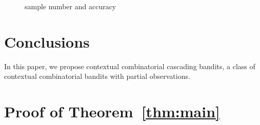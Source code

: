 \documentclass{article}
\begin{document}
\begin{figure}
	\centering
	\caption{sample number and accuracy}
	\label{fig:sample number} %
\end{figure}

\section{Conclusions}

In this paper, we propose contextual combinatorial cascading bandits, a class of contextual combinatorial bandits with partial observations.


	



\appendix

\section{Proof of Theorem~\ref{thm:main}}
\end{document}
